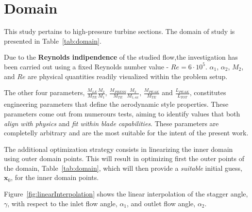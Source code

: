 \section{Domain}

This study pertains to high-pressure turbine sections. 
The domain of study is presented in Table~\ref{tab:domain}.

Due to the \textbf{Reynolds indipendence} of the studied flow,the investigation has been carried out using a fixed Reynolds number value - $Re = 6 \cdot 10^5$. $\alpha_1$, $\alpha_2$, $M_2$, and $Re$ are physical quantities readily visualized within the problem setup.

The other four parameters, $\frac{M_{LE}}{M_{TE}}\frac{M_2}{M_1}$, $\frac{M_{PRESS}}{M_{TE}}\frac{M_2}{M_{1, ax}}$, $\frac{M_{PEAK}}{M_{TE}}$ and $\frac{L_{PEAK}}{L_{TOT}}$, 
constitutes engineering parameters that define the aerodynamic style properties. These parameters come out from numerours tests, aiming to identify values that both \textit{align with physics} and \textit{fit within blade capabilities}. 
These parameters are completelly arbitrary and are the most suitable for the intent of the present work.

The additional optimization strategy consists in linearizing the inner domain using outer domain points.
This will result in optimizing first the outer points of the domain, Table~\ref{tab:domain}, which will then provide a \textit{suitable} initial guess, $\boldsymbol{x}_0$, 
for the inner domain points. 

Figure~\ref{fig:linearInterpolation} shows the linear interpolation of the stagger angle, $\gamma$, with 
respect to the inlet flow angle, $\alpha_1$, and outlet flow angle, $\alpha_2$. 

